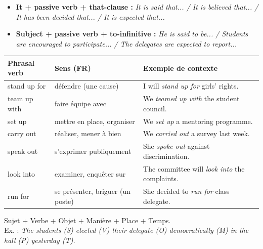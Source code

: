 \documentclass[11pt]{article}
\newcommand{\cle}[1]{{\popxbold\color{popdark}#1}}
\begin{document}
\begin{definition}
\begin{itemize}
    \item \textbf{It + passive verb + that-clause :} \emph{It is said that... / It is believed that... / It has been decided that... / It is expected that...}
    \item \textbf{Subject + passive verb + to-infinitive :} \emph{He is said to be... / Students are encouraged to participate... / The delegates are expected to report...}
\end{itemize}
\end{definition}

\begin{definition}
\begin{center}
\begin{tabularx}{\linewidth}{|l|X|X|}\hline
\rowcolor{popblueL} \textbf{Phrasal verb} & \textbf{Sens (FR)} & \textbf{Exemple de contexte} \\ \hline
\cle{stand up for} & défendre (une cause) & I will \emph{stand up for} girls' rights. \\ \hline
\cle{team up with} & faire équipe avec & We \emph{teamed up with} the student council. \\ \hline
\cle{set up} & mettre en place, organiser & We \emph{set up} a mentoring programme. \\ \hline
\cle{carry out} & réaliser, mener à bien & We \emph{carried out} a survey last week. \\ \hline
\cle{speak out} & s'exprimer publiquement & She \emph{spoke out} against discrimination. \\ \hline
\cle{look into} & examiner, enquêter sur & The committee will \emph{look into} the complaints. \\ \hline
\cle{run for} & se présenter, briguer (un poste) & She decided to \emph{run for} class delegate. \\ \hline
\end{tabularx}
\end{center}
\end{definition}

\begin{propriete}
Sujet + Verbe + Objet + Manière + Place + Temps. \\
Ex. : \emph{The students (S) elected (V) their delegate (O) democratically (M) in the hall (P) yesterday (T).}
\end{propriete}
\end{document}
